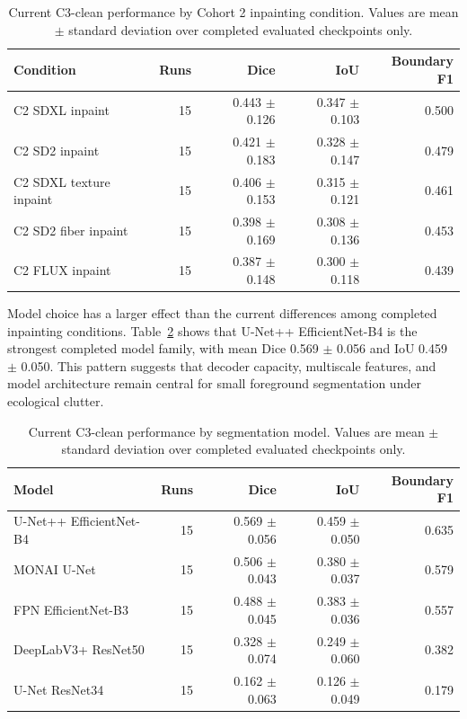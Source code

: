\begin{table}[H]
  \centering
  \caption{Current C3-clean performance by Cohort 2 inpainting condition. Values are mean $\pm$ standard deviation over completed evaluated checkpoints only.}
  \label{tab:c2-condition-results}
  \begin{tabular}{lrrrr}
    \toprule
    \textbf{Condition} & \textbf{Runs} & \textbf{Dice} & \textbf{IoU} & \textbf{Boundary F1} \\
    \midrule
    C2 SDXL inpaint & 15 & 0.443 $\pm$ 0.126 & 0.347 $\pm$ 0.103 & 0.500 \\
    C2 SD2 inpaint & 15 & 0.421 $\pm$ 0.183 & 0.328 $\pm$ 0.147 & 0.479 \\
    C2 SDXL texture inpaint & 15 & 0.406 $\pm$ 0.153 & 0.315 $\pm$ 0.121 & 0.461 \\
    C2 SD2 fiber inpaint & 15 & 0.398 $\pm$ 0.169 & 0.308 $\pm$ 0.136 & 0.453 \\
    C2 FLUX inpaint & 15 & 0.387 $\pm$ 0.148 & 0.300 $\pm$ 0.118 & 0.439 \\
    \bottomrule
  \end{tabular}
\end{table}

Model choice has a larger effect than the current differences among completed inpainting conditions. Table~\ref{tab:c2-model-results} shows that U-Net++ EfficientNet-B4 is the strongest completed model family, with mean Dice 0.569 $\pm$ 0.056 and IoU 0.459 $\pm$ 0.050. This pattern suggests that decoder capacity, multiscale features, and model architecture remain central for small foreground segmentation under ecological clutter.

\begin{table}[H]
  \centering
  \caption{Current C3-clean performance by segmentation model. Values are mean $\pm$ standard deviation over completed evaluated checkpoints only.}
  \label{tab:c2-model-results}
  \begin{tabular}{lrrrr}
    \toprule
    \textbf{Model} & \textbf{Runs} & \textbf{Dice} & \textbf{IoU} & \textbf{Boundary F1} \\
    \midrule
    U-Net++ EfficientNet-B4 & 15 & 0.569 $\pm$ 0.056 & 0.459 $\pm$ 0.050 & 0.635 \\
    MONAI U-Net & 15 & 0.506 $\pm$ 0.043 & 0.380 $\pm$ 0.037 & 0.579 \\
    FPN EfficientNet-B3 & 15 & 0.488 $\pm$ 0.045 & 0.383 $\pm$ 0.036 & 0.557 \\
    DeepLabV3+ ResNet50 & 15 & 0.328 $\pm$ 0.074 & 0.249 $\pm$ 0.060 & 0.382 \\
    U-Net ResNet34 & 15 & 0.162 $\pm$ 0.063 & 0.126 $\pm$ 0.049 & 0.179 \\
    \bottomrule
  \end{tabular}
\end{table}


